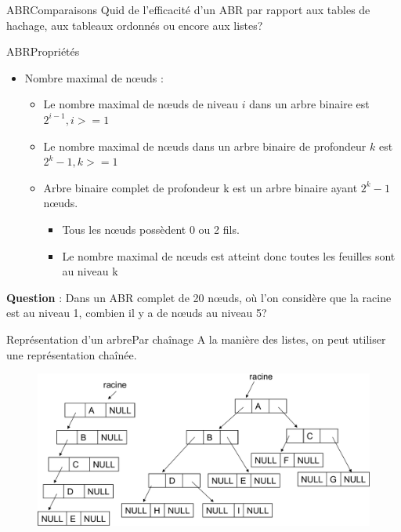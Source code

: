 \documentclass[12pt,a4paper]{beamer}
\newcommand{\hl}[1]{\textcolor{blueemph}{#1}}
\begin{document}
\begin{frame}{ABR}{Comparaisons}
Quid de l'efficacité d'un ABR par rapport aux tables de hachage, aux tableaux ordonnés ou encore aux listes?
\end{frame}


\begin{frame}{ABR}{Propriétés}
\begin{itemize}
\item Nombre maximal de n\oe uds :
\begin{itemize}
\item Le nombre maximal de n\oe uds de niveau $i$ dans un arbre
binaire est $2^{i-1} , i >= 1$
\item Le nombre maximal de n\oe uds dans un arbre binaire de
profondeur $k$ est $2^{k}-1, k >= 1$
\item Arbre binaire \hl{complet} de profondeur k est un arbre
binaire ayant $2^{k}-1$ n\oe uds.
\begin{itemize}
\item Tous les n\oe uds possèdent 0 ou 2 fils.
\item Le nombre maximal de n\oe uds est atteint donc toutes les feuilles sont au niveau k
\end{itemize}
\end{itemize}
\end{itemize}
\textbf{Question} : Dans un ABR complet de 20 n\oe uds, où l'on considère que la racine est au niveau 1, combien il y a de n\oe uds au niveau 5?
\end{frame}

\begin{frame}{Représentation d'un arbre}{Par chaînage}
A la manière des listes, on peut utiliser une représentation chaînée.
\begin{figure}
\includegraphics[scale=0.4]{figs/tree_chainage}
\end{figure}


\end{frame}
\end{document}
